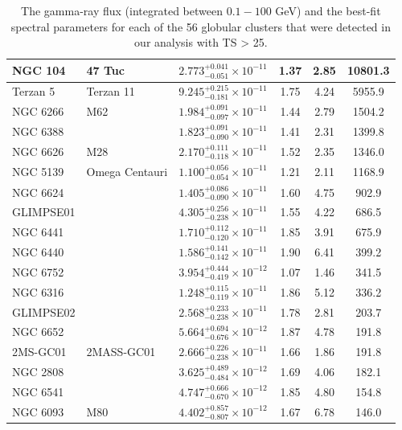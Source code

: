 \begin{longtable}{|l|l|l|c|c|c|}
\hline
\noalign{\vspace{10pt}}
\captionsetup{justification=justified} %
\caption{The gamma-ray flux (integrated between $0.1-100$ GeV) and the best-fit spectral parameters for each of the 56 globular clusters that were detected in our analysis with TS > 25.}
\endlastfoot %
NGC 104 & 47 Tuc & $2.773^{+0.041}_{-0.051} \times 10^{-11}$ & 1.37 & 2.85 & 10801.3 \\\hline
Terzan 5 & Terzan 11 & $9.245^{+0.215}_{-0.181} \times 10^{-11}$ & 1.75 & 4.24 & 5955.9 \\\hline
NGC 6266 & M62 & $1.984^{+0.091}_{-0.097} \times 10^{-11}$ & 1.44 & 2.79 & 1504.2 \\\hline
NGC 6388 & & $1.823^{+0.091}_{-0.090} \times 10^{-11}$ & 1.41 & 2.31 & 1399.8 \\\hline
NGC 6626 & M28 & $2.170^{+0.111}_{-0.118} \times 10^{-11}$ & 1.52 & 2.35 & 1346.0 \\\hline
NGC 5139 & Omega Centauri & $1.100^{+0.056}_{-0.054} \times 10^{-11}$ & 1.21 & 2.11 & 1168.9 \\\hline
NGC 6624 & & $1.405^{+0.086}_{-0.090} \times 10^{-11}$ & 1.60 & 4.75 & 902.9 \\\hline
GLIMPSE01 & & $4.305^{+0.256}_{-0.238} \times 10^{-11}$ & 1.55 & 4.22 & 686.5 \\\hline
NGC 6441 & & $1.710^{+0.112}_{-0.120} \times 10^{-11}$ & 1.85 & 3.91 & 675.9 \\\hline
NGC 6440 & & $1.586^{+0.141}_{-0.142} \times 10^{-11}$ & 1.90 & 6.41 & 399.2 \\\hline
NGC 6752 & & $3.954^{+0.444}_{-0.419} \times 10^{-12}$ & 1.07 & 1.46 & 341.5 \\\hline
NGC 6316 & & $1.248^{+0.115}_{-0.119} \times 10^{-11}$ & 1.86 & 5.12 & 336.2 \\\hline
GLIMPSE02 & & $2.568^{+0.233}_{-0.238} \times 10^{-11}$ & 1.78 & 2.81 & 203.7 \\\hline
NGC 6652 & & $5.664^{+0.694}_{-0.676} \times 10^{-12}$ & 1.87 & 4.78 & 191.8 \\\hline
2MS-GC01 & 2MASS-GC01 & $2.666^{+0.226}_{-0.238} \times 10^{-11}$ & 1.66 & 1.86 & 191.8 \\\hline
NGC 2808 & & $3.625^{+0.489}_{-0.484} \times 10^{-12}$ & 1.69 & 4.06 & 182.1 \\\hline
NGC 6541 & & $4.747^{+0.666}_{-0.670} \times 10^{-12}$ & 1.85 & 4.80 & 154.8 \\\hline
NGC 6093 & M80 & $4.402^{+0.857}_{-0.807} \times 10^{-12}$ & 1.67 & 6.78 & 146.0 \\\hline

\end{longtable}
